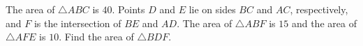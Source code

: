The area of $\triangle ABC$ is $40$. Points $D$ and $E$ lie on sides $BC$ and $AC$, respectively, and $F$ is the intersection of $BE$ and $AD$. The area of $\triangle ABF$ is $15$ and the area of $\triangle AFE$ is $10$. Find the area of $\triangle BDF$.
